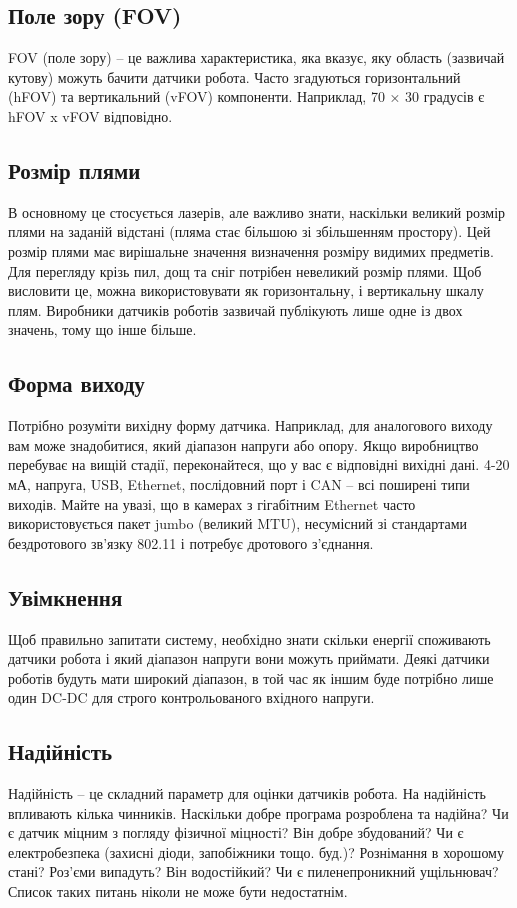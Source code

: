 \documentclass[a4paper,14pt]{extreport}
\begin{document}
\subsection{Поле зору (FOV)}
FOV (поле зору) – це важлива характеристика, яка вказує, яку область (зазвичай кутову) можуть бачити датчики робота. Часто згадуються горизонтальний (hFOV) та вертикальний (vFOV) компоненти. Наприклад, 70 × 30 градусів є hFOV x vFOV відповідно.

\subsection{Розмір плями}
В основному це стосується лазерів, але важливо знати, наскільки великий розмір плями на заданій відстані (пляма стає більшою зі збільшенням простору). Цей розмір плями має вирішальне значення визначення розміру видимих  предметів. Для перегляду крізь пил, дощ та сніг потрібен невеликий розмір плями. Щоб висловити це, можна використовувати як горизонтальну, і вертикальну шкалу плям. Виробники датчиків роботів зазвичай публікують лише одне із двох значень, тому що інше більше.

\subsection{Форма виходу}
Потрібно розуміти вихідну форму датчика. Наприклад, для аналогового виходу вам може знадобитися, який діапазон напруги або опору. Якщо виробництво перебуває на вищій стадії, переконайтеся, що у вас є відповідні вихідні дані. 4-20 мА, напруга, USB, Ethernet, послідовний порт і CAN – всі поширені типи виходів. Майте на увазі, що в камерах з гігабітним Ethernet часто використовується пакет jumbo (великий MTU), несумісний зі стандартами бездротового зв'язку 802.11 і потребує дротового з'єднання.

\subsection{Увімкнення}
Щоб правильно запитати систему, необхідно знати скільки енергії споживають датчики робота і який діапазон напруги вони можуть приймати. Деякі датчики роботів будуть мати широкий діапазон, в той час як іншим буде потрібно лише один DC-DC для строго контрольованого вхідного напруги.

\subsection{Надійність}
Надійність – це складний параметр для оцінки датчиків робота. На надійність впливають кілька чинників. Наскільки добре програма розроблена та надійна? Чи є датчик міцним з погляду фізичної міцності? Він добре збудований? Чи є електробезпека (захисні діоди, запобіжники тощо. буд.)? Рознімання в хорошому стані? Роз'єми випадуть? Він водостійкий? Чи є пиленепроникний ущільнювач? Список таких питань ніколи не може бути недостатнім.
\end{document}
